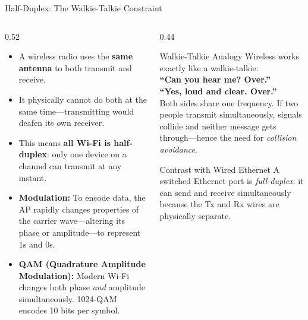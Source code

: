 \documentclass[aspectratio=169]{beamer}
\begin{document}
\begin{frame}{Half-Duplex: The Walkie-Talkie Constraint}
    \begin{columns}[T]
        \begin{column}{0.52\textwidth}
            \footnotesize
            \begin{itemize}
                \item A wireless radio uses the \textbf{same antenna} to both transmit and receive.
                \item It physically cannot do both at the same time---transmitting would deafen its own receiver.
                \item This means \textbf{all Wi-Fi is half-duplex}: only one device on a channel can transmit at any instant.
                \item \textbf{Modulation:} To encode data, the AP rapidly changes properties of the carrier wave---altering its phase or amplitude---to represent 1s and 0s.
                \item \textbf{QAM (Quadrature Amplitude Modulation):} Modern Wi-Fi changes both phase \emph{and} amplitude simultaneously. 1024-QAM encodes 10 bits per symbol.
            \end{itemize}
        \end{column}
        \begin{column}{0.44\textwidth}
            \begin{block}{Walkie-Talkie Analogy}
                \footnotesize
                Wireless works exactly like a walkie-talkie:\\[0.3em]
                \textbf{``Can you hear me? Over.''}\\
                \textbf{``Yes, loud and clear. Over.''}\\[0.3em]
                Both sides share one frequency. If two people transmit simultaneously, signals collide and neither message gets through---hence the need for \emph{collision avoidance}.
            \end{block}
            \vspace{0.3em}
            \begin{alertblock}{Contrast with Wired Ethernet}
                \footnotesize
                A switched Ethernet port is \emph{full-duplex}: it can send and receive simultaneously because the Tx and Rx wires are physically separate.
            \end{alertblock}
        \end{column}
    \end{columns}
\end{frame}
\end{document}
